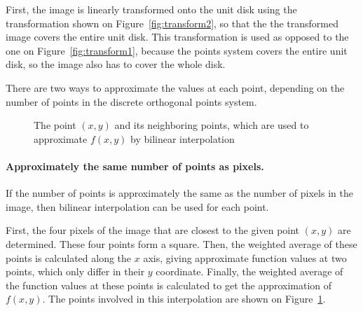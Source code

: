 First, the image is linearly transformed onto the unit disk using the transformation shown on Figure~\ref{fig:transform2}, so that the the transformed image covers the entire unit disk. This transformation is used as opposed to the one on Figure~\ref{fig:transform1}, because the points system covers the entire unit disk, so the image also has to cover the whole disk.

There are two ways to approximate the values at each point, depending on the number of points in the discrete orthogonal points system.

\begin{figure}[tb]
    \centering

    \caption{The point $(x,y)$ and its neighboring points, which are used to approximate $f(x,y)$ by bilinear interpolation}
    \label{fig:bilinear}
\end{figure}

\paragraph{Approximately the same number of points as pixels.}
If the number of points is approximately the same as the number of pixels in the image, then bilinear interpolation can be used for each point.

First, the four pixels of the image that are closest to the given point $(x,y)$ are determined. These four points form a square. Then, the weighted average of these points is calculated along the $x$ axis, giving approximate function values at two points, which only differ in their $y$ coordinate. Finally, the weighted average of the function values at these points is calculated to get the approximation of $f(x,y)$. The points involved in this interpolation are shown on Figure~\ref{fig:bilinear}.



